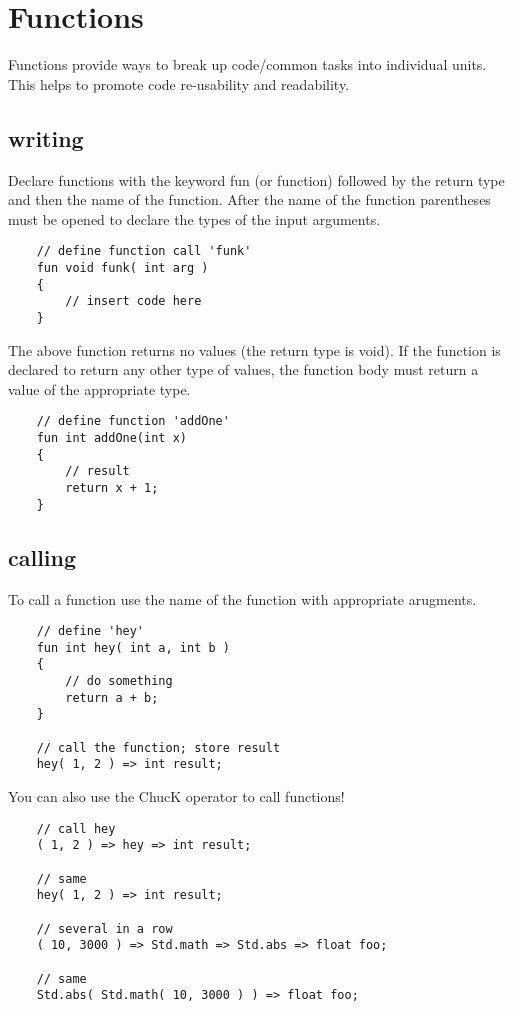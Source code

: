 \chapter{Functions}

Functions provide ways to break up code/common tasks into individual units. This helps to promote code re-usability and readability.

\section{writing}

Declare functions with the keyword fun (or  function) followed by the return type and then the name of the function. After the name of the function parentheses must be opened to declare the types of the input arguments.
\begin{verbatim}
    // define function call 'funk'
    fun void funk( int arg )
    {
        // insert code here
    }
\end{verbatim}

The above function returns no values (the return type is void). If the function is declared to return any other type of values, the function body must return a value of the appropriate type.
\begin{verbatim}
    // define function 'addOne'
    fun int addOne(int x)
    {
        // result
        return x + 1;
    }
\end{verbatim}
 
\section{calling}

To call a function use the name of the function with appropriate arugments.
\begin{verbatim}
    // define 'hey'
    fun int hey( int a, int b )
    {
        // do something
        return a + b;
    }

    // call the function; store result
    hey( 1, 2 ) => int result;
\end{verbatim}

You can also use the ChucK operator to call functions!
\begin{verbatim}
    // call hey
    ( 1, 2 ) => hey => int result;

    // same
    hey( 1, 2 ) => int result;

    // several in a row
    ( 10, 3000 ) => Std.math => Std.abs => float foo;

    // same
    Std.abs( Std.math( 10, 3000 ) ) => float foo;
\end{verbatim}
 
